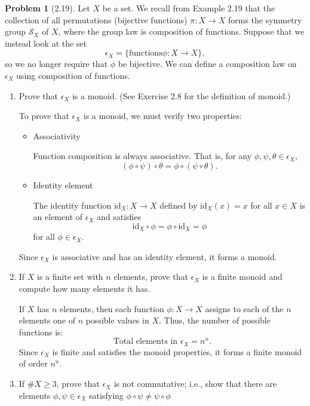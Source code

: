 \documentclass[12pt]{article}
\theoremstyle{definition}
\newtheorem{problem}{Problem}
\begin{document}
\begin{problem}[2.19]
    Let $X$ be a set. We recall from Example 2.19 that the collection of all permutations (bijective functions)
    $\pi : X \rightarrow X$ forms the symmetry group $\mathcal{S}_X$ of $X$, where the group law is composition
    of functions. Suppose that we instead look at the set
    \[
        \epsilon_X = \{\text{functions} \phi : X \longrightarrow X\},
    \]
    so we no longer require that $\phi$ be bijective. We can define a composition law on $\epsilon_X$ using composition of functions. 
    \begin{enumerate}[label=(\alph*)]
        \item Prove that $\epsilon_X$ is a monoid. (See Exercise 2.8 for the definition of monoid.)
        
            \begin{solution}
                To prove that $\epsilon_X$ is a monoid, we must verify two properties:
                \begin{itemize}
                    \item Associativity
                    
                        Function composition is always associative. That is, for any $\phi, \psi, \theta \in \epsilon_X$,
                        \[
                        (\phi \circ \psi) \circ \theta = \phi \circ (\psi \circ \theta).
                        \]
                    \item Identity element
                        
                        The identity function $\text{id}_X: X \to X$ defined by $\text{id}_X(x) = x$ for all $x \in X$ is an element of $\epsilon_X$ and satisfies
                        \[
                        \text{id}_X \circ \phi = \phi \circ \text{id}_X = \phi
                        \]
                        for all $\phi \in \epsilon_X$.
                \end{itemize}
            Since $\epsilon_X$ is associative and has an identity element, it forms a monoid.
            
            \end{solution}
        \item If $X$ is a finite set with $n$ elements, prove that $\epsilon_X$ is a finite monoid and compute how many elements it has.
            
            \begin{solution}
                If $X$ has $n$ elements, then each function $\phi: X \to X$ assigns to each of the $n$ elements one of $n$ possible values in $X$. Thus, the number of possible functions is:
                \[
                \text{Total elements in } \epsilon_X = n^n.
                \]
                Since $\epsilon_X$ is finite and satisfies the monoid properties, it forms a finite monoid of order $n^n$.
            \end{solution}
        \item If $\#X\geq 3$, prove that $\epsilon_X$ is not commutative; i.e., show that there are elements $\phi, \psi \in \epsilon_X$ satisfying $\phi\circ\psi \neq \psi\circ\phi$
            

\end{enumerate}
\end{problem}
\end{document}
